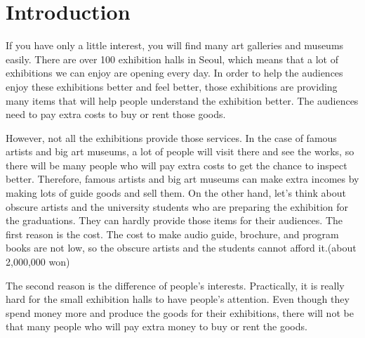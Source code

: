 \documentclass[conference]{IEEEtran}
\begin{document}





%
\IEEEpeerreviewmaketitle


\large
\section{Introduction}
If you have only a little interest, you will find many art galleries and museums easily. There are over 100 exhibition halls in Seoul, which means that a lot of exhibitions we can enjoy are opening every day. In order to help the audiences enjoy these exhibitions better and feel better, those exhibitions are providing many items that will help people understand the exhibition better. The audiences need to pay extra costs to buy or rent those goods.

However, not all the exhibitions provide those services. In the case of famous artists and big art museums, a lot of people will visit there and see the works, so there will be many people who will pay extra costs to get the chance to inspect better. Therefore, famous artists and big art museums can make extra incomes by making lots of guide goods and sell them.
On the other hand, let’s think about obscure artists and the university students who are preparing the exhibition for the graduations. They can hardly provide those items for their audiences. The first reason is the cost. The cost to make audio guide, brochure, and program books are not low, so the obscure artists and the students cannot afford it.(about 2,000,000 won)

 The second reason is the difference of people’s interests. Practically, it is really hard for the small exhibition halls to have people’s attention. Even though they spend money more and produce the goods for their exhibitions, there will not be that many people who will pay extra money to buy or rent the goods.
\end{document}
